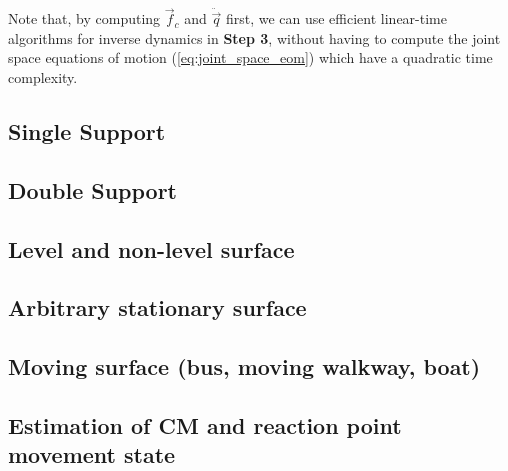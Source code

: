 \documentclass{llncs}
\newcommand{\vf}{\vec{f}}
\newcommand{\vddq} {\ddot{\vec{q}}}
\begin{document}
Note that, by computing $\vf_c$ and $\vddq$ first,
we can use efficient linear-time algorithms for inverse dynamics in {\bf Step 3},
without having to compute the joint space equations of motion (\ref{eq:joint_space_eom})
which have a quadratic time complexity.


\subsection{Single Support}

\subsection{Double Support}

\subsection{Level and non-level surface}

\subsection{Arbitrary stationary surface}

\subsection{Moving surface (bus, moving walkway, boat)}

\subsection{Estimation of CM and reaction point movement state}
\end{document}
